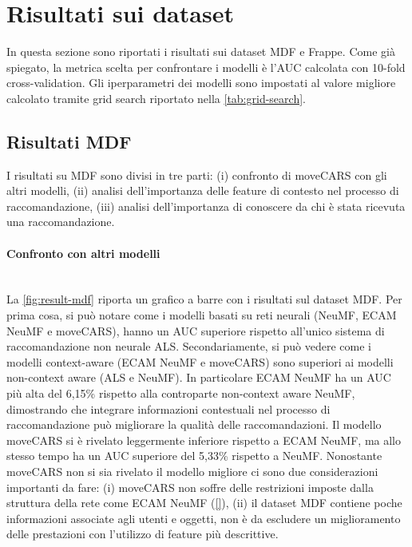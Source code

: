 \documentclass[12pt,italian]{report}
\newcommand{\myparagraph}[1]{\paragraph{#1}\mbox{}\\} %
\begin{document}
\section{Risultati sui dataset} \label{sec:results}
In questa sezione sono riportati i risultati sui dataset MDF e Frappe. Come già spiegato, la metrica scelta per confrontare i modelli è l'AUC calcolata con 10-fold cross-validation. Gli iperparametri dei modelli sono impostati al valore migliore calcolato tramite grid search riportato nella \autoref{tab:grid-search}.
\subsection{Risultati MDF}
I risultati su MDF sono divisi in tre parti: (i) confronto di moveCARS con gli altri modelli, (ii) analisi dell'importanza delle feature di contesto nel processo di raccomandazione, (iii) analisi dell'importanza di conoscere da chi è stata ricevuta una raccomandazione.

\myparagraph{Confronto con altri modelli}
La \autoref{fig:result-mdf} riporta un grafico a barre con i risultati sul dataset MDF. Per prima cosa, si può notare come i modelli basati su reti neurali (NeuMF, ECAM NeuMF e moveCARS), hanno un AUC superiore rispetto all'unico sistema di raccomandazione non neurale ALS. Secondariamente, si può vedere come i modelli context-aware (ECAM NeuMF e moveCARS) sono superiori ai modelli non-context aware (ALS e NeuMF). In particolare ECAM NeuMF ha un AUC più alta del 6,15\%  rispetto alla controparte non-context aware NeuMF, dimostrando che integrare informazioni contestuali nel processo di raccomandazione può migliorare la qualità delle raccomandazioni. Il modello moveCARS si è rivelato leggermente inferiore rispetto a ECAM NeuMF, ma allo stesso tempo ha un AUC superiore del 5,33\% rispetto a NeuMF. Nonostante moveCARS non si sia rivelato il modello migliore ci sono due considerazioni importanti da fare: (i) moveCARS non soffre delle restrizioni imposte dalla struttura della rete come ECAM NeuMF (\autoref{}), (ii) il dataset MDF contiene poche informazioni associate agli utenti e oggetti, non è da escludere un miglioramento delle prestazioni con l'utilizzo di feature più descrittive.
\end{document}
